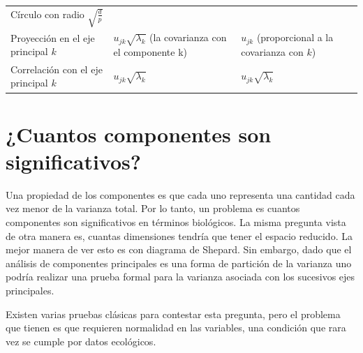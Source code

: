 \documentclass[]{book}
\theoremstyle{definition}
\theoremstyle{definition}
\theoremstyle{definition}
\theoremstyle{remark}
\begin{document}
\begin{longtable}[]{@{}lll@{}}
\begin{minipage}[t]{0.31\columnwidth}
Círculo con radio \(\sqrt{\frac{d}{p}}\)\strut
\end{minipage}\tabularnewline
\begin{minipage}[t]{0.22\columnwidth}\raggedright
Proyección en el eje principal \(k\)\strut
\end{minipage} & \begin{minipage}[t]{0.38\columnwidth}\raggedright
\(u_{jk}\sqrt{\lambda_{k}}\) (la covarianza con el componente k)\strut
\end{minipage} & \begin{minipage}[t]{0.31\columnwidth}\raggedright
\(u_{jk}\) (proporcional a la covarianza con \(k\))\strut
\end{minipage}\tabularnewline
\begin{minipage}[t]{0.22\columnwidth}\raggedright
Correlación con el eje principal \(k\)\strut
\end{minipage} & \begin{minipage}[t]{0.38\columnwidth}\raggedright
\(u_{jk}\sqrt{\lambda_{k}}\)\strut
\end{minipage} & \begin{minipage}[t]{0.31\columnwidth}\raggedright
\(u_{jk}\sqrt{\lambda_{k}}\)\strut
\end{minipage}\tabularnewline
\bottomrule
\end{longtable}

\hypertarget{cuantos-componentes-son-significativos}{%
\section{¿Cuantos componentes son
significativos?}\label{cuantos-componentes-son-significativos}}

Una propiedad de los componentes es que cada uno representa una cantidad
cada vez menor de la varianza total. Por lo tanto, un problema es
cuantos componentes son significativos en términos biológicos. La misma
pregunta vista de otra manera es, cuantas dimensiones tendría que tener
el espacio reducido. La mejor manera de ver esto es con diagrama de
Shepard. Sin embargo, dado que el análisis de componentes principales es
una forma de partición de la varianza uno podría realizar una prueba
formal para la varianza asociada con los sucesivos ejes principales.

Existen varias pruebas clásicas para contestar esta pregunta, pero el
problema que tienen es que requieren normalidad en las variables, una
condición que rara vez se cumple por datos ecológicos.
\end{document}
